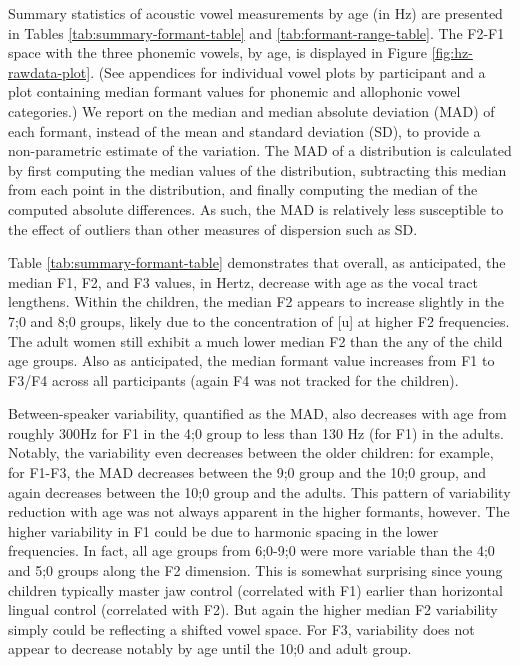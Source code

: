 \documentclass[
]{article}
\begin{document}
Summary statistics of acoustic vowel measurements by age (in Hz) are presented in Tables \ref{tab:summary-formant-table} and \ref{tab:formant-range-table}. The F2-F1 space with the three phonemic vowels, by age, is displayed in Figure \ref{fig:hz-rawdata-plot}. (See appendices for individual vowel plots by participant and a plot containing median formant values for phonemic and allophonic vowel categories.) We report on the median and median absolute deviation (MAD) of each formant, instead of the mean and standard deviation (SD), to provide a non-parametric estimate of the variation. The MAD of a distribution is calculated by first computing the median values of the distribution, subtracting this median from each point in the distribution, and finally computing the median of the computed absolute differences. As such, the MAD is relatively less susceptible to the effect of outliers than other measures of dispersion such as SD.

Table \ref{tab:summary-formant-table} demonstrates that overall, as anticipated, the median F1, F2, and F3 values, in Hertz, decrease with age as the vocal tract lengthens. Within the children, the median F2 appears to increase slightly in the 7;0 and 8;0 groups, likely due to the concentration of {[}u{]} at higher F2 frequencies. The adult women still exhibit a much lower median F2 than the any of the child age groups. Also as anticipated, the median formant value increases from F1 to F3/F4 across all participants (again F4 was not tracked for the children).

Between-speaker variability, quantified as the MAD, also decreases with age from roughly 300Hz for F1 in the 4;0 group to less than 130 Hz (for F1) in the adults. Notably, the variability even decreases between the older children: for example, for F1-F3, the MAD decreases between the 9;0 group and the 10;0 group, and again decreases between the 10;0 group and the adults. This pattern of variability reduction with age was not always apparent in the higher formants, however. The higher variability in F1 could be due to harmonic spacing in the lower frequencies. In fact, all age groups from 6;0-9;0 were more variable than the 4;0 and 5;0 groups along the F2 dimension. This is somewhat surprising since young children typically master jaw control (correlated with F1) earlier than horizontal lingual control (correlated with F2). But again the higher median F2 variability simply could be reflecting a shifted vowel space. For F3, variability does not appear to decrease notably by age until the 10;0 and adult group.
\end{document}
